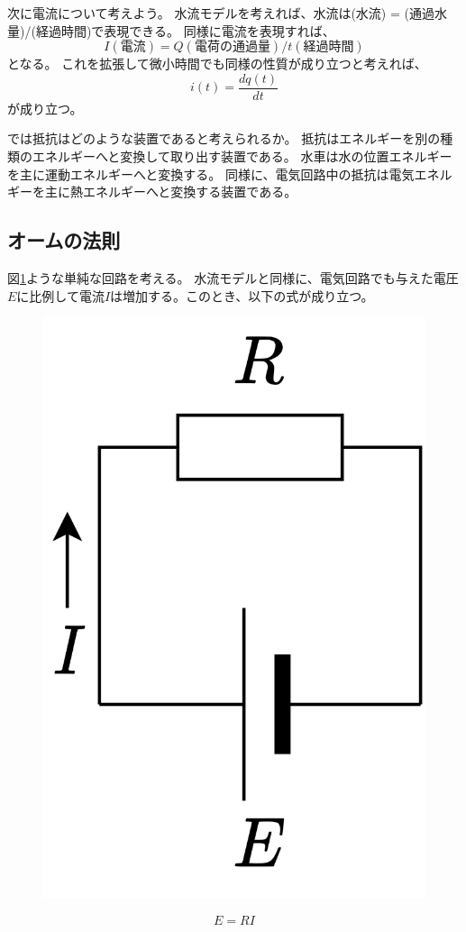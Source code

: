 \documentclass{ltjsreport}
\begin{document}
次に電流について考えよう。
水流モデルを考えれば、水流は(水流) = (通過水量)/(経過時間)で表現できる。
同様に電流を表現すれば、
\[  
  I(電流) = Q(電荷の通過量)/t(経過時間)
  \]
となる。
これを拡張して微小時間でも同様の性質が成り立つと考えれば、
\[
  i(t) = \frac{dq(t)}{dt}
\]
が成り立つ。

では抵抗はどのような装置であると考えられるか。
抵抗はエネルギーを別の種類のエネルギーへと変換して取り出す装置である。
水車は水の位置エネルギーを主に運動エネルギーへと変換する。
同様に、電気回路中の抵抗は電気エネルギーを主に熱エネルギーへと変換する装置である。

\subsection{オームの法則}
図\ref{fig:ohm}ような単純な回路を考える。
水流モデルと同様に、電気回路でも与えた電圧$E$に比例して電流$I$は増加する。このとき、以下の式が成り立つ。

\begin{figure}[bt]
  \centering
  \includegraphics[keepaspectratio, scale=0.07]
       {img/ohm.drawio.png}
  \caption{}
  \label{fig:ohm}
 \end{figure}
\begin{equation}
  E = RI \label{eq:ohm}
\end{equation}
\end{document}
